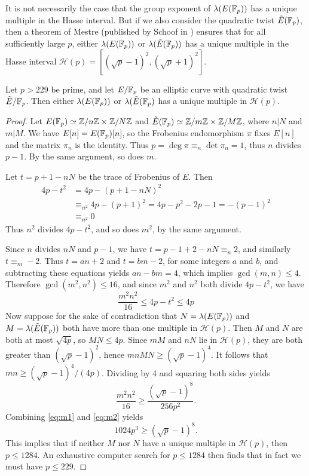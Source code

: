 It is not necessarily the case that the group exponent of $\lambda(E(\mathbb{F}_p))$ has a unique multiple in the Hasse interval.
But if we also consider the quadratic twist $\tilde{E}(\mathbb{F}_p)$, then a theorem of Mestre (published by Schoof in \cite{Schoof}) ensures that for all sufficiently large $p$, either $\lambda(E(\mathbb{F}_p))$ or $\lambda(\tilde{E}(\mathbb{F}_p))$ has a unique multiple in the Hasse interval $\mathcal{H}(p)=[(\sqrt{p}-1)^2,(\sqrt{p}+1)^2]$.

\begin{thm}[Mestre]\label{thm:mestre}
Let $p>229$ be prime, and let $E/\mathbb{F}_p$ be an elliptic curve with quadratic twist $\tilde{E}/\mathbb{F}_p$.
Then either $\lambda(E(\mathbb{F}_p))$ or $\lambda(\tilde{E}(\mathbb{F}_p)$  has a unique multiple in $\mathcal{H}(p)$.
\end{thm}
\begin{proof}
Let $E(\mathbb{F}_p)\simeq \mathbb{Z}/n\mathbb{Z}\times\mathbb{Z}/N\mathbb{Z}$ and  $\tilde E(\mathbb{F}_p)\simeq \mathbb{Z}/m\mathbb{Z}\times\mathbb{Z}/M\mathbb{Z}$, where $n|N$ and $m|M$.
We have $E[n]=E(\mathbb{F}_p)[n]$, so the Frobenius endomorphism $\pi$ fixes $E[n]$ and the matrix $\pi_n$ is the identity.
Thus $p=\deg\pi\equiv_n\det\pi_n = 1$, thus $n$ divides $p-1$.  By the same argument, so does $m$.

Let $t=p+1-nN$ be the trace of Frobenius of $E$.  Then
\begin{align*}
4p-t^2 &= 4p-(p+1-nN)^2\\
               &\equiv_{n^2} 4p-(p+1)^2 = 4p-p^2-2p-1 = -(p-1)^2\\
               &\equiv_{n^2} 0
\end{align*}
Thus $n^2$ divides $4p-t^2$, and so does $m^2$, by the same argument.

Since $n$ divides $nN$ and $p-1$, we have $t=p-1+2-nN\equiv_n 2$, and similarly $t\equiv_m -2$.
Thus $t=an+2$ and $t=bm-2$, for some integers $a$ and $b$, and subtracting these equations yields $an-bm=4$, which implies $\gcd(m,n)\le 4$.
Therefore $\gcd(m^2,n^2)\le 16$, and since $m^2$ and $n^2$ both divide $4p-t^2$, we have
\begin{equation}\label{eq:m1}
\frac{m^2n^2}{16} \le 4p-t^2 \le 4p
\end{equation}
Now suppose for the sake of contradiction that $N=\lambda(E(\mathbb{F}_p))$ and $M=\lambda(\tilde{E}(\mathbb{F}_p))$ both have more than one multiple in $\mathcal{H}(p)$.
Then $M$ and $N$ are both at most $\sqrt{4p}$, so $MN\le 4p$.
Since $mM$ and $nN$ lie in $\mathcal{H}(p)$, they are both greater than $(\sqrt{p}-1)^2$, hence $mnMN \ge (\sqrt{p}-1)^4$.
It follows that $mn\ge (\sqrt{p}-1)^4/(4p)$.  Dividing by 4 and squaring both sides yields
\begin{equation}\label{eq:m2}
\frac{m^2n^2}{16}\ge\frac{(\sqrt{p}-1)^8}{256p^2}.
\end{equation}
 Combining \eqref{eq:m1} and \eqref{eq:m2} yields
\begin{equation}
1024p^3\ge (\sqrt{p}-1)^8.
\end{equation}
This implies that if neither $M$ nor $N$ have a unique multiple in $\mathcal{H}(p)$, then $p\le 1284$.
An exhaustive computer search for $p\le 1284$ then finds that in fact we must have $p\le 229$.
\end{proof}



